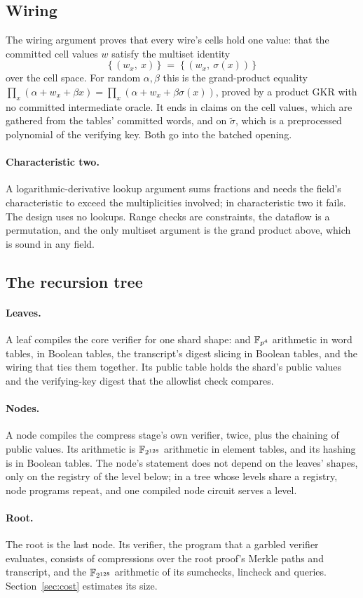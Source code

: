 \subsection{Wiring}

The wiring argument proves that every wire's cells hold one value: that the committed cell values $w$ satisfy the multiset identity
\[
\{\,(w_x,\ x)\,\} \;=\; \{\,(w_x,\ \sigma(x))\,\}
\]
over the cell space. For random $\alpha,\beta$ this is the grand-product equality $\prod_x(\alpha + w_x + \beta x) = \prod_x(\alpha + w_x + \beta\sigma(x))$, proved by a product GKR with no committed intermediate oracle. It ends in claims on the cell values, which are gathered from the tables' committed words, and on $\tilde\sigma$, which is a preprocessed polynomial of the verifying key. Both go into the batched opening.

\paragraph{Characteristic two.} A logarithmic-derivative lookup argument sums fractions and needs the field's characteristic to exceed the multiplicities involved; in characteristic two it fails. The design uses no lookups. Range checks are \AND{} constraints, the dataflow is a permutation, and the only multiset argument is the grand product above, which is sound in any field.

\subsection{The recursion tree}

\paragraph{Leaves.} A leaf compiles the core verifier for one shard shape: \KB{} and $\mathbb{F}_{p^4}$ arithmetic in word tables, \Blake{} in Boolean tables, the transcript's digest slicing in Boolean tables, and the wiring that ties them together. Its public table holds the shard's public values and the verifying-key digest that the allowlist check compares.

\paragraph{Nodes.} A node compiles the compress stage's own verifier, twice, plus the chaining of public values. Its arithmetic is $\mathbb{F}_{2^{128}}$ arithmetic in element tables, and its hashing is \Blake{} in Boolean tables. The node's statement does not depend on the leaves' shapes, only on the registry of the level below; in a tree whose levels share a registry, node programs repeat, and one compiled node circuit serves a level.

\paragraph{Root.} The root is the last node. Its verifier, the program that a garbled verifier evaluates, consists of \Blake{} compressions over the root proof's Merkle paths and transcript, and the $\mathbb{F}_{2^{128}}$ arithmetic of its sumchecks, lincheck and \WHIR{} queries. Section~\ref{sec:cost} estimates its size.

